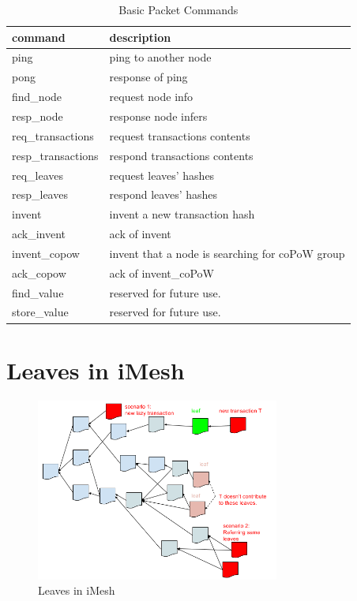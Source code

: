 \documentclass[a4paper,10pt,twocolumn]{article}
\begin{document}
 \begin{table}[htb]
	\caption{Basic Packet Commands}
    \label{tbl:cmd}
	\begin{tabularx}{\linewidth}{XX} 
		command & description \\
		\toprule
  ping & ping to another node \\
  pong & response of ping \\
  find\_node & request node info\\
    resp\_node & response node infers \\
  req\_transactions & request transactions contents \\
  resp\_transactions & respond transactions contents \\
  req\_leaves & request  leaves' hashes \\
  resp\_leaves &  respond leaves' hashes \\
  invent &  invent a new transaction hash \\
  ack\_invent & ack of invent \\
  invent\_copow & invent that a node is searching for coPoW group \\
  ack\_copow & ack of invent\_coPoW \\
  find\_value &  reserved for future use.\\
  store\_value & reserved for future use.\\
  \bottomrule
\end{tabularx}
  \end{table}


\section{Leaves in iMesh}
\label{sec:leaves}

\begin{figure}[ht]
	\begin{center}
	\includegraphics[width=80mm]{leaves.png}
	  \caption{Leaves in iMesh}
    \label{fig:leaves}
	\end{center}
 \end{figure}
\end{document}
